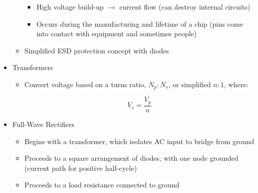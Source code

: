 \begin{itemize}
\begin{itemize}
\begin{itemize}
          \item High voltage build-up $\to$ current flow (can destroy internal circuits)

          \item Occurs during the manufacturing and lifetime of a chip (pins come into contact with equipment and sometimes people)

        \end{itemize}

      \item Simplified ESD protection concept with diodes

    \end{itemize}

  \item Transformers

    \begin{itemize}

      \item Convert voltage based on a turns ratio, $N_p:N_s$, or simplified $n:1$, where:

        $$V_s=\frac{V_p}{n}$$

    \end{itemize}

  \item Full-Wave Rectifiers

    \begin{itemize}

      \item Begins with a transformer, which isolates AC input to bridge from ground

      \item Proceeds to a square arrangement of diodes, with one node grounded (current path for positive half-cycle)

      \item Proceeds to a load resistance connected to ground

    \end{itemize}

\end{itemize}



